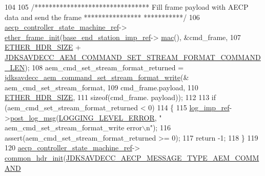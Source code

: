 \begin{DoxyCode}
104 
105     \textcolor{comment}{/******************************** Fill frame payload with AECP data and send the frame ****************
      ***********/}
106     \hyperlink{namespaceavdecc__lib_a0b1b5aea3c0490f77cbfd9178af5be22}{aecp\_controller\_state\_machine\_ref}->
      \hyperlink{classavdecc__lib_1_1aecp__controller__state__machine_a86ff947c5e6b799cfb877d3767bfa1f9}{ether\_frame\_init}(\hyperlink{classavdecc__lib_1_1descriptor__base__imp_a550c969411f5f3b69f55cc139763d224}{base\_end\_station\_imp\_ref}->
      \hyperlink{classavdecc__lib_1_1end__station__imp_a08e1bd1861b3b8f447ea374a65ac11f9}{mac}(), &cmd\_frame,
107                                                         \hyperlink{namespaceavdecc__lib_a6c827b1a0d973e18119c5e3da518e65ca9512ad9b34302ba7048d88197e0a2dc0}{ETHER\_HDR\_SIZE} + 
      \hyperlink{group__command__set__stream__format_ga54f70043611f17ce7ca3c27c68a02fa6}{JDKSAVDECC\_AEM\_COMMAND\_SET\_STREAM\_FORMAT\_COMMAND\_LEN});
108     aem\_cmd\_set\_stream\_format\_returned = 
      \hyperlink{group__command__set__stream__format_ga52683ffa93eb5b180190041f82194ca9}{jdksavdecc\_aem\_command\_set\_stream\_format\_write}(&
      aem\_cmd\_set\_stream\_format,
109                                                                                         cmd\_frame.payload,
110                                                                                         
      \hyperlink{namespaceavdecc__lib_a6c827b1a0d973e18119c5e3da518e65ca9512ad9b34302ba7048d88197e0a2dc0}{ETHER\_HDR\_SIZE},
111                                                                                         \textcolor{keyword}{sizeof}(cmd\_frame.
      payload));
112 
113     \textcolor{keywordflow}{if} (aem\_cmd\_set\_stream\_format\_returned < 0)
114     \{
115         \hyperlink{namespaceavdecc__lib_acbe3e2a96ae6524943ca532c87a28529}{log\_imp\_ref}->\hyperlink{classavdecc__lib_1_1log_a68139a6297697e4ccebf36ccfd02e44a}{post\_log\_msg}(\hyperlink{namespaceavdecc__lib_a501055c431e6872ef46f252ad13f85cdaf2c4481208273451a6f5c7bb9770ec8a}{LOGGING\_LEVEL\_ERROR}, \textcolor{stringliteral}{"
      aem\_cmd\_set\_stream\_format\_write error\(\backslash\)n"});
116         assert(aem\_cmd\_set\_stream\_format\_returned >= 0);
117         \textcolor{keywordflow}{return} -1;
118     \}
119 
120     \hyperlink{namespaceavdecc__lib_a0b1b5aea3c0490f77cbfd9178af5be22}{aecp\_controller\_state\_machine\_ref}->
      \hyperlink{classavdecc__lib_1_1aecp__controller__state__machine_aafc737d7ed17a62fed9df6528f18d3ec}{common\_hdr\_init}(\hyperlink{group__aecp__message__type_ga4625ce189cc209f42deb0629f48faf69}{JDKSAVDECC\_AECP\_MESSAGE\_TYPE\_AEM\_COMMAND}

\end{DoxyCode}
